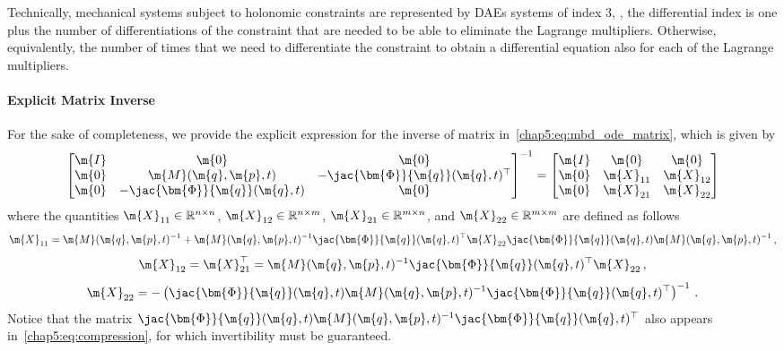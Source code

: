 Technically, mechanical systems subject to holonomic constraints are represented by \acp{DAE} systems of index 3, \ie{}, the differential index is one plus the number of differentiations of the constraint that are needed to be able to eliminate the Lagrange multipliers. Otherwise, equivalently, the number of times that we need to differentiate the constraint to obtain a differential equation also for each of the Lagrange multipliers.

\paragraph{Explicit Matrix Inverse}

For the sake of completeness, we provide the explicit expression for the inverse of matrix in~\eqref{chap5:eq:mbd_ode_matrix}, which is given by
%
\begin{equation*}
  \begin{bmatrix}
    \m{I} & \m{0} & \m{0} \\
    \m{0} & \m{M}(\m{q}, \m{p}, t) & -\jac{\bm{\Phi}}{\m{q}}(\m{q}, t)^{\top} \\
    \m{0} & -\jac{\bm{\Phi}}{\m{q}}(\m{q}, t) & \m{0}
  \end{bmatrix}^{-1}
  =
  \begin{bmatrix}
  \m{I} & \m{0} & \m{0} \\
  \m{0} & \m{X}_{11} & \m{X}_{12} \\
  \m{0} & \m{X}_{21} & \m{X}_{22}
  \end{bmatrix}
\end{equation*}
%
where the quantities $\m{X}_{11} \in \mathbb{R}^{n \times n}$, $\m{X}_{12} \in \mathbb{R}^{n \times m}$, $\m{X}_{21} \in \mathbb{R}^{m \times n}$, and $\m{X}_{22} \in \mathbb{R}^{m \times m}$ are defined as follows
%
\begin{equation*}
  \m{X}_{11} = \m{M}(\m{q}, \m{p}, t)^{-1} + \m{M}(\m{q}, \m{p}, t)^{-1} \jac{\bm{\Phi}}{\m{q}}(\m{q}, t)^{\top} \m{X}_{22} \jac{\bm{\Phi}}{\m{q}}(\m{q}, t)\m{M}(\m{q}, \m{p}, t)^{-1} \, \text{,}
\end{equation*}
\begin{equation*}
  \m{X}_{12} = \m{X}_{21}^{\top} = \m{M}(\m{q}, \m{p}, t)^{-1}\jac{\bm{\Phi}}{\m{q}}(\m{q}, t)^{\top} \m{X}_{22} \, \text{,}
\end{equation*}
\begin{equation*}
  \m{X}_{22} = -\left(\jac{\bm{\Phi}}{\m{q}}(\m{q}, t) \m{M}(\m{q}, \m{p}, t)^{-1}\jac{\bm{\Phi}}{\m{q}}(\m{q}, t)^{\top}\right)^{-1} \, \text{.}
\end{equation*}
%
Notice that the matrix $\jac{\bm{\Phi}}{\m{q}}(\m{q}, t)\m{M}(\m{q}, \m{p}, t)^{-1} \jac{\bm{\Phi}}{\m{q}}(\m{q}, t)^{\top}$ also appears in~\eqref{chap5:eq:compression}, for which invertibility must be guaranteed.

